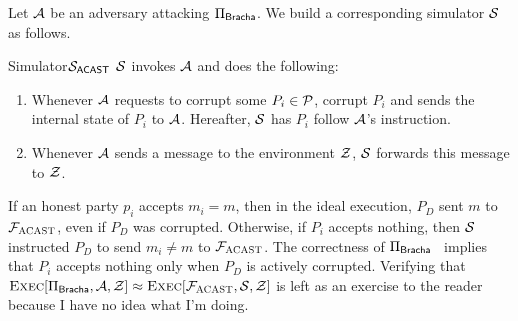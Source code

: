 \documentclass{llncs}
\begin{document}
\begin{proof-sketch}
Let $\mathcal{{A}}$ be an adversary attacking $\Pi_{\sf Bracha}$. We build a
corresponding simulator $\mathcal{{S}}$ as follows.

\begin{boxdef}{Simulator}{$\mathcal{{S}}_{\sf ACAST}$}
$\mathcal{{S}}$ invokes $\mathcal{{A}}$ and does the following:
\begin{enumerate}
  \item Whenever $\mathcal{{A}}$ requests to corrupt some $P_i \in \mathcal{{P}}$, corrupt $P_i$
  and sends the internal state of $P_i$ to $\mathcal{{A}}$. Hereafter, $\mathcal{{S}}$ has
  $P_i$ follow $\mathcal{{A}}$'s instruction.
  \item Whenever $\mathcal{{A}}$ sends a message to the environment $\mathcal{{Z}}$, $\mathcal{{S}}$
  forwards this message to $\mathcal{{Z}}$.
\end{enumerate}
\end{boxdef}

\noindent If an honest party $p_i$ accepts $m_i = m$, then in the ideal execution, $P_D$
sent $m$ to $\mathcal{{F}}_{\textsc{ACAST}}$, even if $P_D$ was corrupted. Otherwise, if $P_i$
accepts nothing, then $\mathcal{{S}}$ instructed $P_D$ to send $m_i \neq m$ to
$\mathcal{{F}}_{\textsc{ACAST}}$. The correctness of $\Pi_{\sf
Bracha}$~\cite{bracha1987asynchronous} implies that $P_i$ accepts nothing only
when $P_D$ is actively corrupted. Verifying that $\textsc{Exec}[\Pi_{\sf
Bracha}, \mathcal{{A}}, \mathcal{{Z}}] \approx \textsc{Exec}[\mathcal{{F}}_{\textsc{ACAST}}, \mathcal{{S}}, \mathcal{{Z}}]$ is left
as an exercise to the reader because I have no idea what I'm doing.
\end{proof-sketch}
    


\end{document}
